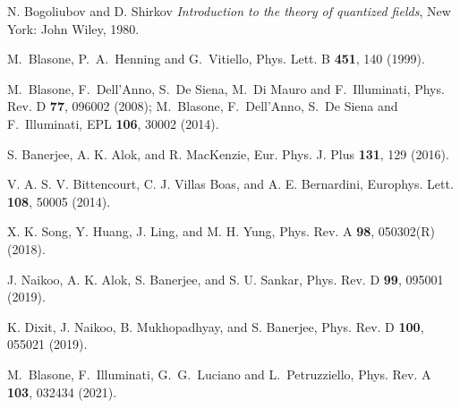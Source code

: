 \documentclass[floats,prd,aps,amssymb,nofootinbib,showkeys]{revtex4}
\begin{document}
\begin{thebibliography}{0}
N. Bogoliubov and D. Shirkov \emph{Introduction to the theory of quantized fields}, New York: John Wiley, 1980.

M.~Blasone, P.~A.~Henning and G.~Vitiello,
Phys. Lett. B \textbf{451}, 140 (1999). 

M.~Blasone, F.~Dell'Anno, S.~De Siena, M.~Di Mauro and F.~Illuminati,
Phys. Rev. D \textbf{77}, 096002 (2008);
M.~Blasone, F.~Dell'Anno, S.~De Siena and F.~Illuminati,
EPL \textbf{106}, 30002 (2014).

S. Banerjee, A. K. Alok, and R. MacKenzie, Eur. Phys. J. Plus {\bf 131}, 129 (2016).

V. A. S. V. Bittencourt, C. J. Villas Boas, and A. E. Bernardini, Europhys. Lett. {\bf 108}, 50005 (2014).

X. K. Song, Y. Huang, J. Ling, and M. H. Yung, Phys. Rev. A {\bf 98}, 050302(R) (2018).

 J. Naikoo, A. K. Alok, S. Banerjee, and S. U. Sankar, Phys. Rev. D {\bf99}, 095001 (2019).
 
 K. Dixit, J. Naikoo, B. Mukhopadhyay, and S. Banerjee, Phys. Rev. D {\bf100}, 055021 (2019).

M.~Blasone, F.~Illuminati, G.~G.~Luciano and L.~Petruzziello,
Phys. Rev. A \textbf{103}, 032434 (2021). 

  
  \end{thebibliography}
\end{document}
